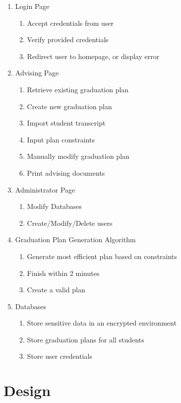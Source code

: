 \documentclass[letterpaper]{report}
\begin{document}
	\begin{enumerate}
		\item Login Page
		\begin{enumerate}
			\item Accept credentials from user
			\item Verify provided credentials
			\item Redirect user to homepage, or display error
		\end{enumerate}
	
		\item Advising Page
		\begin{enumerate}
			\item Retrieve existing graduation plan
			\item Create new graduation plan
			\item Import student transcript
			\item Input plan constraints
			\item Manually modify graduation plan
			\item Print advising documents
		\end{enumerate}	
	
		\item Administrator Page
		\begin{enumerate}
			\item Modify Databases
			\item Create/Modify/Delete users\\
		\end{enumerate}
	
		\item Graduation Plan Generation Algorithm
		\begin{enumerate}
			\item Generate most efficient plan based on constraints
			\item Finish within 2 minutes
			\item Create a valid plan
		\end{enumerate}
	
		\item Databases
		\begin{enumerate}
			\item Store sensitive data in an encrypted environment
			\item Store graduation plans for all students
			\item Store user credentials
		\end{enumerate}
	\end{enumerate}
	\section{Design}
\end{document}
